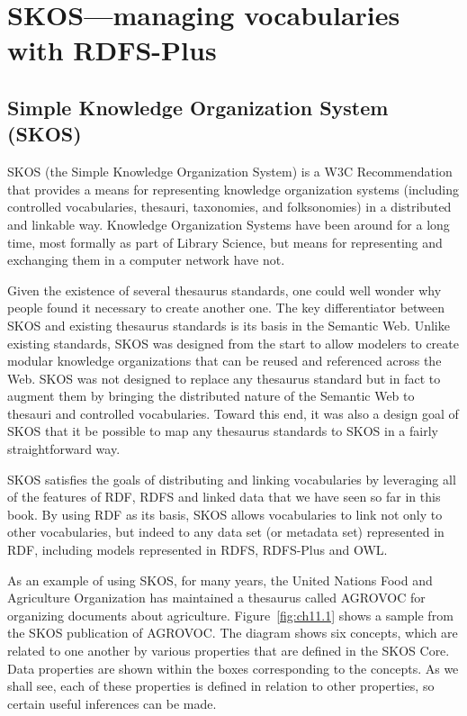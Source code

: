 \chapter{SKOS---managing vocabularies with RDFS-Plus}
\label{ch11}



\section{Simple Knowledge Organization System (SKOS)}
\label{ch11.skos}
SKOS (the Simple Knowledge Organization System) is a W3C Recommendation
that provides a means for representing knowledge organization systems
(including controlled vocabularies, thesauri, taxonomies, and
folksonomies) in a distributed and linkable way. Knowledge Organization
Systems have been around for a long time, most formally as part of
Library Science, but means for representing and exchanging them in a
computer network have not.

Given the existence of several thesaurus standards, one could well
wonder why people found it necessary to create another one. The key
differentiator between SKOS and existing thesaurus standards is its
basis in the Semantic Web. Unlike existing standards, SKOS was designed
from the start to allow modelers to create modular knowledge
organizations that can be reused and referenced across the Web. SKOS was
not designed to replace any thesaurus standard but in fact to augment
them by bringing the distributed nature of the Semantic Web to thesauri
and controlled vocabularies. Toward this end, it was also a design goal
of SKOS that it be possible to map any thesaurus standards to SKOS in a
fairly straightforward way.

SKOS satisfies the goals of distributing and linking vocabularies by leveraging
all of the features of RDF, RDFS and linked data that we have seen so far in this book. 
By using RDF as its basis, SKOS allows vocabularies to link not only to other vocabularies, but 
indeed to any data set (or metadata set) represented in RDF, including 
models represented in RDFS, RDFS-Plus and OWL. 

As an example of using SKOS, for many years, the United Nations Food and
Agriculture Organization has maintained a thesaurus called AGROVOC \cite{caracciolo2013agrovoc} for
organizing documents about agriculture. Figure~\ref{fig:ch11.1} shows a sample from
the SKOS publication of AGROVOC. The diagram shows six concepts, which
are related to one another by various properties that are defined in the
SKOS Core. Data properties are shown within the boxes corresponding to
the concepts. As we shall see, each of these properties is defined in
relation to other properties, so certain useful inferences can be made.

